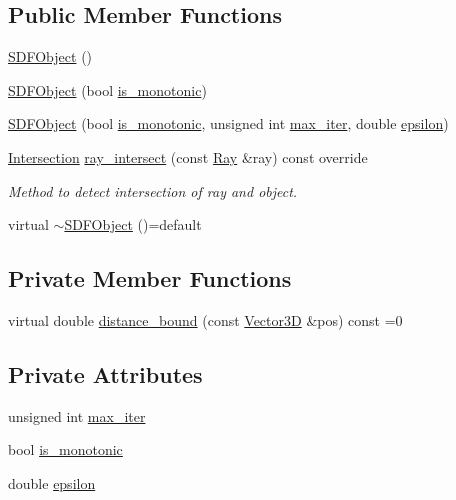 \subsection*{Public Member Functions}
\begin{DoxyCompactItemize}
\item 
\mbox{\hyperlink{classSDFObject_a9aeb5037eb692e6502ae2c523ed87b29}{S\+D\+F\+Object}} ()
\item 
\mbox{\hyperlink{classSDFObject_a56fffe33b0be8b81e2a38df61d09ccfd}{S\+D\+F\+Object}} (bool \mbox{\hyperlink{classSDFObject_af366e048b8af77961de4a1c5a45dc110}{is\+\_\+monotonic}})
\item 
\mbox{\hyperlink{classSDFObject_a908bc77db501ad2b4e04dcecc389cfee}{S\+D\+F\+Object}} (bool \mbox{\hyperlink{classSDFObject_af366e048b8af77961de4a1c5a45dc110}{is\+\_\+monotonic}}, unsigned int \mbox{\hyperlink{classSDFObject_aff2946d73110ace629e66f9eac2c13aa}{max\+\_\+iter}}, double \mbox{\hyperlink{classSDFObject_a5bcc7f77148687f9545f0ade0db6c7f0}{epsilon}})
\item 
\mbox{\hyperlink{classIntersection}{Intersection}} \mbox{\hyperlink{classSDFObject_a3870048585282b8176a05ca46ab8695d}{ray\+\_\+intersect}} (const \mbox{\hyperlink{classRay}{Ray}} \&ray) const override
\begin{DoxyCompactList}\small\item\em Method to detect intersection of ray and object. \end{DoxyCompactList}\item 
virtual \mbox{\hyperlink{classSDFObject_a3ceca3fd0d007ecb4b39993d30afa623}{$\sim$\+S\+D\+F\+Object}} ()=default
\end{DoxyCompactItemize}
\subsection*{Private Member Functions}
\begin{DoxyCompactItemize}
\item 
virtual double \mbox{\hyperlink{classSDFObject_ac34f5232b6ea395178d33e3b084d5a93}{distance\+\_\+bound}} (const \mbox{\hyperlink{classVector3D}{Vector3D}} \&pos) const =0
\end{DoxyCompactItemize}
\subsection*{Private Attributes}
\begin{DoxyCompactItemize}
\item 
unsigned int \mbox{\hyperlink{classSDFObject_aff2946d73110ace629e66f9eac2c13aa}{max\+\_\+iter}}
\item 
bool \mbox{\hyperlink{classSDFObject_af366e048b8af77961de4a1c5a45dc110}{is\+\_\+monotonic}}
\item 
double \mbox{\hyperlink{classSDFObject_a5bcc7f77148687f9545f0ade0db6c7f0}{epsilon}}
\end{DoxyCompactItemize}
